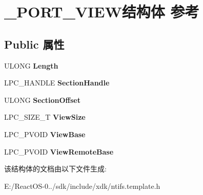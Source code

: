 \hypertarget{struct___p_o_r_t___v_i_e_w}{}\section{\+\_\+\+P\+O\+R\+T\+\_\+\+V\+I\+E\+W结构体 参考}
\label{struct___p_o_r_t___v_i_e_w}
\subsection*{Public 属性}
\begin{DoxyCompactItemize}
\item 
\mbox{\label{struct___p_o_r_t___v_i_e_w_a9c87bcb3bebd1ff257191bcd31afb8ab}} 
U\+L\+O\+NG {\bfseries Length}
\item 
\mbox{\label{struct___p_o_r_t___v_i_e_w_ac5a469160ffca2101febee2786232f87}} 
L\+P\+C\+\_\+\+H\+A\+N\+D\+LE {\bfseries Section\+Handle}
\item 
\mbox{\label{struct___p_o_r_t___v_i_e_w_ace42dd072be3e47296070a1752905cf4}} 
U\+L\+O\+NG {\bfseries Section\+Offset}
\item 
\mbox{\label{struct___p_o_r_t___v_i_e_w_afef45cb3fa3da9807b645c79813cf113}} 
L\+P\+C\+\_\+\+S\+I\+Z\+E\+\_\+T {\bfseries View\+Size}
\item 
\mbox{\label{struct___p_o_r_t___v_i_e_w_a04f68b7a27361bb2df8157904f367671}} 
L\+P\+C\+\_\+\+P\+V\+O\+ID {\bfseries View\+Base}
\item 
\mbox{\label{struct___p_o_r_t___v_i_e_w_ac5d0c82407d554a872d83e4ac4bdff98}} 
L\+P\+C\+\_\+\+P\+V\+O\+ID {\bfseries View\+Remote\+Base}
\end{DoxyCompactItemize}


该结构体的文档由以下文件生成\+:\begin{DoxyCompactItemize}
\item 
E\+:/\+React\+O\+S-\/0../sdk/include/xdk/ntifs.\+template.\+h\end{DoxyCompactItemize}
